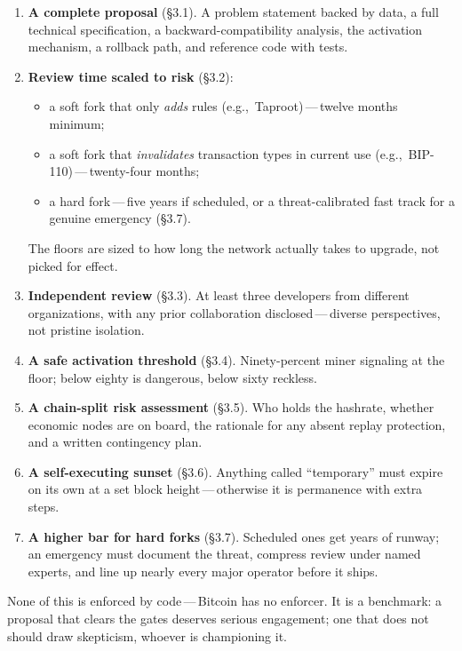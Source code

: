 \documentclass[11pt, twoside, openright]{book}
\newcommand{\sect}[1]{\S#1}
\begin{document}
\begin{plainenglish}
\begin{enumerate}[itemsep=3pt, topsep=4pt, parsep=1pt]
  \item \textbf{A complete proposal} (\sect{3.1}). A problem statement backed by data, a full technical specification, a backward-compatibility analysis, the activation mechanism, a rollback path, and reference code with tests.
  \item \textbf{Review time scaled to risk} (\sect{3.2}):
  \begin{itemize}[topsep=2pt, itemsep=1pt, parsep=0pt, leftmargin=1.4em]
    \item a soft fork that only \textit{adds} rules (e.g.,~Taproot)\,---\,twelve months minimum;
    \item a soft fork that \textit{invalidates} transaction types in current use (e.g.,~BIP-110)\,---\,twenty-four months;
    \item a hard fork\,---\,five years if scheduled, or a threat-calibrated fast track for a genuine emergency (\sect{3.7}).
  \end{itemize}
  The floors are sized to how long the network actually takes to upgrade, not picked for effect.
  \item \textbf{Independent review} (\sect{3.3}). At least three developers from different organizations, with any prior collaboration disclosed\,---\,diverse perspectives, not pristine isolation.
  \item \textbf{A safe activation threshold} (\sect{3.4}). Ninety-percent miner signaling at the floor; below eighty is dangerous, below sixty reckless.
  \item \textbf{A chain-split risk assessment} (\sect{3.5}). Who holds the hashrate, whether economic nodes are on board, the rationale for any absent replay protection, and a written contingency plan.
  \item \textbf{A self-executing sunset} (\sect{3.6}). Anything called ``temporary'' must expire on its own at a set block height\,---\,otherwise it is permanence with extra steps.
  \item \textbf{A higher bar for hard forks} (\sect{3.7}). Scheduled ones get years of runway; an emergency must document the threat, compress review under named experts, and line up nearly every major operator before it ships.
\end{enumerate}

None of this is enforced by code\,---\,Bitcoin has no enforcer. It is a benchmark: a proposal that clears the gates deserves serious engagement; one that does not should draw skepticism, whoever is championing it.
\end{plainenglish}
\end{document}
